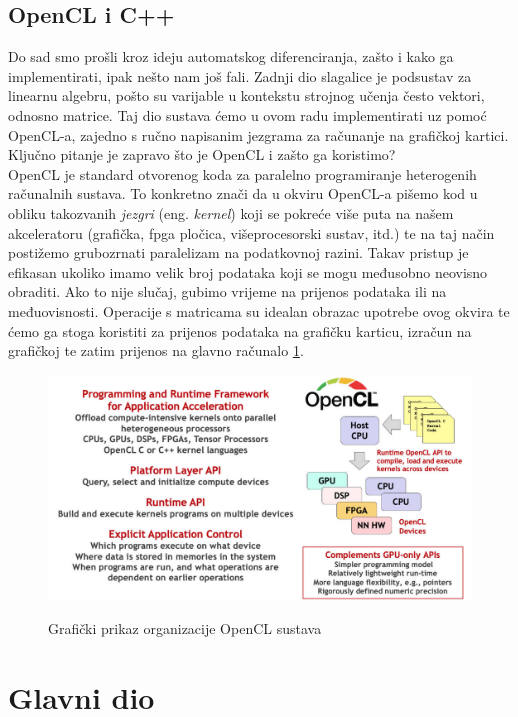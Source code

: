 \documentclass[zavrsnirad]{fer}
\begin{document}
\section{OpenCL i C++}
Do sad smo prošli kroz ideju automatskog diferenciranja, zašto i kako ga implementirati, ipak nešto nam još fali. Zadnji dio slagalice je podsustav za linearnu algebru, pošto su varijable u kontekstu strojnog učenja često vektori, odnosno matrice. Taj dio sustava ćemo u ovom radu implementirati uz pomoć OpenCL-a, zajedno s ručno napisanim jezgrama za računanje na grafičkoj kartici. Ključno pitanje je zapravo što je OpenCL i zašto ga koristimo?
\\
OpenCL je standard otvorenog koda za paralelno programiranje heterogenih računalnih sustava. To konkretno znači da u okviru OpenCL-a pišemo kod u obliku takozvanih \textit{jezgri} (eng. \textit{kernel}) koji se pokreće više puta na našem akceleratoru (grafička, fpga pločica, višeprocesorski sustav, itd.) te na taj način postižemo grubozrnati paralelizam na podatkovnoj razini. Takav pristup je efikasan ukoliko imamo velik broj podataka koji se mogu međusobno neovisno obraditi. Ako to nije slučaj, gubimo vrijeme na prijenos podataka ili na međuovisnosti. Operacije s matricama su idealan obrazac upotrebe ovog okvira te ćemo ga stoga koristiti za prijenos podataka na grafičku karticu, izračun na grafičkoj te zatim prijenos na glavno računalo \ref{slk:opencl}.
\\
\begin{figure}[h]
  \centering
  \includegraphics[width=0.85\linewidth]{./slike/opencl.jpg}
  \caption{Grafički prikaz organizacije OpenCL sustava}
  \cite{opencl}
  \label{slk:opencl}
\end{figure}

\chapter{Glavni dio}
\label{pog:glavni_dio}
\end{document}
